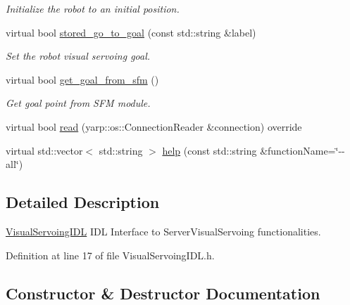 \begin{DoxyCompactItemize}
\begin{DoxyCompactList}\small\item\em Initialize the robot to an initial position. \end{DoxyCompactList}\item 
virtual bool \hyperlink{classVisualServoingIDL_aa751cf35650259ae7cff331c9d19c694}{stored\+\_\+go\+\_\+to\+\_\+goal} (const std\+::string \&label)
\begin{DoxyCompactList}\small\item\em Set the robot visual servoing goal. \end{DoxyCompactList}\item 
virtual bool \hyperlink{classVisualServoingIDL_aff8af7d3ebe68f5fbfa7197eb7115723}{get\+\_\+goal\+\_\+from\+\_\+sfm} ()
\begin{DoxyCompactList}\small\item\em Get goal point from S\+FM module. \end{DoxyCompactList}\item 
virtual bool \hyperlink{classVisualServoingIDL_a97106bf829447896de03680d78b960a5}{read} (yarp\+::os\+::\+Connection\+Reader \&connection) override
\item 
virtual std\+::vector$<$ std\+::string $>$ \hyperlink{classVisualServoingIDL_a99974ef8858179f14e2762c2d7bf4ed5}{help} (const std\+::string \&function\+Name=\char`\"{}-\/-\/all\char`\"{})
\end{DoxyCompactItemize}


\subsection{Detailed Description}
\hyperlink{classVisualServoingIDL}{Visual\+Servoing\+I\+DL} I\+DL Interface to Server\+Visual\+Servoing functionalities. 

Definition at line 17 of file Visual\+Servoing\+I\+D\+L.\+h.



\subsection{Constructor \& Destructor Documentation}
\mbox{\label{classVisualServoingIDL_adff6d75dfaede0453d02b6f017e9e977}} 
